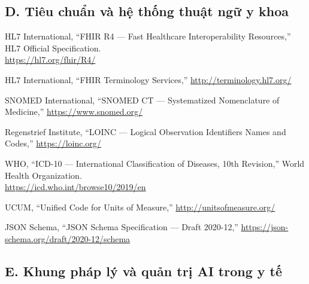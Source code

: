 \documentclass[12pt,a4paper]{article}
\begin{document}
\subsection*{D. Tiêu chuẩn và hệ thống thuật ngữ y khoa}

\begin{enumerate}[label={[D\arabic*]}]

\item HL7 International, ``FHIR R4 --- Fast Healthcare Interoperability Resources,''
HL7 Official Specification.\\
\url{https://hl7.org/fhir/R4/}

\item HL7 International, ``FHIR Terminology Services,''
\url{http://terminology.hl7.org/}

\item SNOMED International, ``SNOMED CT --- Systematized Nomenclature of Medicine,''
\url{https://www.snomed.org/}

\item Regenstrief Institute, ``LOINC --- Logical Observation Identifiers Names and Codes,''
\url{https://loinc.org/}

\item WHO, ``ICD-10 --- International Classification of Diseases, 10th Revision,''
World Health Organization.\\
\url{https://icd.who.int/browse10/2019/en}

\item UCUM, ``Unified Code for Units of Measure,''
\url{http://unitsofmeasure.org/}

\item JSON Schema, ``JSON Schema Specification --- Draft 2020-12,''
\url{https://json-schema.org/draft/2020-12/schema}

\end{enumerate}

\subsection*{E. Khung pháp lý và quản trị AI trong y tế}
\end{document}
